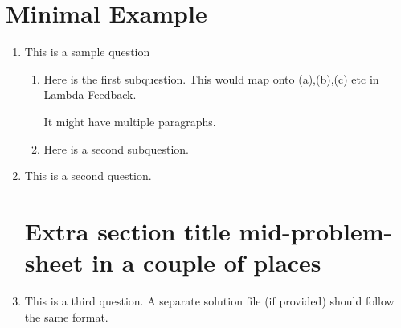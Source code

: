 \documentclass[12pt]{article}
\begin{document}
\section*{Minimal Example}

\begin{enumerate}

      \item This is a sample question

            \begin{enumerate}

                  \item Here is the first subquestion. This would map onto (a),(b),(c) etc in Lambda Feedback.

                        It might have multiple paragraphs.

                  \item Here is a second subquestion.

            \end{enumerate}

      \item This is a second question.

            \section*{Extra section title mid-problem-sheet in a couple of places}

      \item This is a third question. A separate solution file (if provided) should follow the same format.

\end{enumerate}
\end{document}
